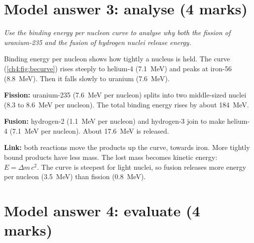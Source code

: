 \begin{markingcriteria}
\end{markingcriteria}

\section*{Model answer 3: analyse (4 marks)}

\emph{Use the binding energy per nucleon curve to analyse why both the fission of
uranium-235 and the fusion of hydrogen nuclei release energy.}

\begin{modelanswer}
 Binding energy per nucleon shows how tightly a nucleus is held. The curve
(\cref{ch4:fig:becurve}) rises steeply to helium-4 (\qty{7.1}{MeV}) and peaks at iron-56
(\qty{8.8}{MeV}). Then it falls slowly to uranium (\qty{7.6}{MeV}).

 \textbf{Fission:} uranium-235 (\qty{7.6}{MeV} per nucleon) splits into two
middle-sized nuclei (8.3 to \qty{8.6}{MeV} per nucleon). The total binding energy rises by
about \qty{184}{MeV}.

 \textbf{Fusion:} hydrogen-2 (\qty{1.1}{MeV} per nucleon) and hydrogen-3 join to
make helium-4 (\qty{7.1}{MeV} per nucleon). About \qty{17.6}{MeV} is released.

 \textbf{Link:} both reactions move the products up the curve, towards iron.
More tightly bound products have less mass. The lost mass becomes kinetic energy:
$E = \Delta m\,c^2$. The curve is steepest for light nuclei, so fusion releases more energy
per nucleon (\qty{3.5}{MeV}) than fission (\qty{0.8}{MeV}).
\end{modelanswer}

\begin{markingcriteria}
\end{markingcriteria}

\section*{Model answer 4: evaluate (4 marks)}

